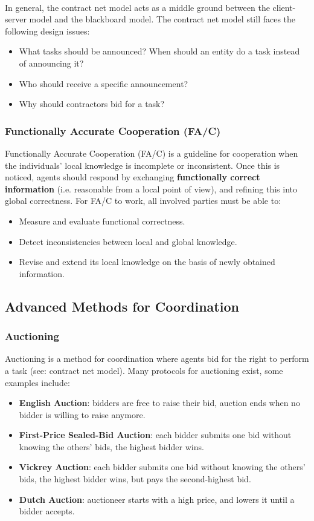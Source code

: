 \documentclass[12pt]{article}
\begin{document}
\noindent
\\
In general, the contract net model acts as a middle ground between the client-server model and the blackboard model.
The contract net model still faces the following design issues:

\begin{itemize}
    \item What tasks should be announced? When should an entity do a task instead of announcing it?
    \item Who should receive a specific announcement?
    \item Why should contractors bid for a task?
\end{itemize}

\subsubsection{Functionally Accurate Cooperation (FA/C)}
Functionally Accurate Cooperation (FA/C) is a guideline for cooperation when the individuals' local knowledge is incomplete or inconsistent.
Once this is noticed, agents should respond by exchanging \textbf{functionally correct information} (i.e. reasonable from a local point of view), and refining this into global correctness. 
For FA/C to work, all involved parties must be able to:

\begin{itemize}
    \item Measure and evaluate functional correctness.
    \item Detect inconsistencies between local and global knowledge.
    \item Revise and extend its local knowledge on the basis of newly obtained information.
\end{itemize}

\subsection{Advanced Methods for Coordination}
\subsubsection{Auctioning}
Auctioning is a method for coordination where agents bid for the right to perform a task (see: contract net model).
Many protocols for auctioning exist, some examples include:

\begin{itemize}
    \item \textbf{English Auction}: bidders are free to raise their bid, auction ends when no bidder is willing to raise anymore.
    \item \textbf{First-Price Sealed-Bid Auction}: each bidder submits one bid without knowing the others' bids, the highest bidder wins.
    \item \textbf{Vickrey Auction}: each bidder submits one bid without knowing the others' bids, the highest bidder wins, but pays the second-highest bid.
    \item \textbf{Dutch Auction}: auctioneer starts with a high price, and lowers it until a bidder accepts.
\end{itemize}
\end{document}
